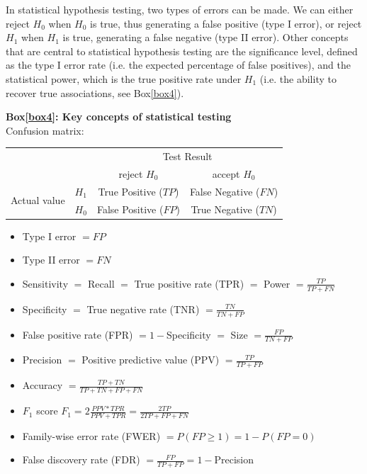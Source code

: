 In statistical hypothesis testing, two types of errors can be made. 
We can either reject $H_0$ when $H_0$ is true, thus generating a false positive (type I error), or reject $H_1$ when $H_1$ is true, generating a false negative (type II error).
Other concepts that are central to statistical hypothesis testing are the significance level, defined as the type I error rate (i.e. the expected percentage of false positives), and the statistical power, which is the true positive rate under $H_1$ (i.e. the ability to recover true associations, see Box\ref{box4}).


\newpage

\begin{Comment}
\hspace{-2.5mm}\textbf{Box\ref{box4}: Key concepts of statistical testing}\label{box4}\\
Confusion matrix:

\begin{center}
\begin{tabular}{l|l|c|c|}
\multicolumn{2}{c}{}&\multicolumn{2}{c}{Test Result}\\
\cline{3-4}
\multicolumn{2}{c|}{}&reject $H_0$&accept $H_0$\\
\cline{2-4}
\multirow{2}{*}{Actual value}& $H_1$ & True Positive ($TP$) & False Negative ($FN$)\\
\cline{2-4}
& $H_0$ & False Positive ($FP$) & True Negative ($TN$)\\
\cline{2-4}
\end{tabular}
\end{center}

\begin{itemize}
    \item Type I error $= FP$
    \item Type II error $= FN$
    \item Sensitivity $=$ Recall $=$ True positive rate (TPR) $=$ Power $=\frac{TP}{TP+FN}$
    \item Specificity $=$ True negative rate (TNR) $=\frac{TN}{TN+FP}$
    \item False positive rate (FPR) $= 1-$Specificity $=$ Size $=\frac{FP}{TN+FP}$
    \item Precision $=$ Positive predictive value (PPV) $=\frac{TP}{TP+FP}$
    \item Accuracy $=\frac{TP+TN}{TP+TN+FP+FN}$
    \item $F_1$ score $F_1=2 \frac{PPV*TPR}{PPV+TPR}=\frac{2TP}{2TP+FP+FN}$
    \item Family-wise error rate (FWER) $=P(FP \geq 1)= 1 - P(FP=0)$
    \item False discovery rate (FDR) $=\frac{FP}{TP+FP}= 1- $Precision
\end{itemize}

\vfill

\end{Comment}

